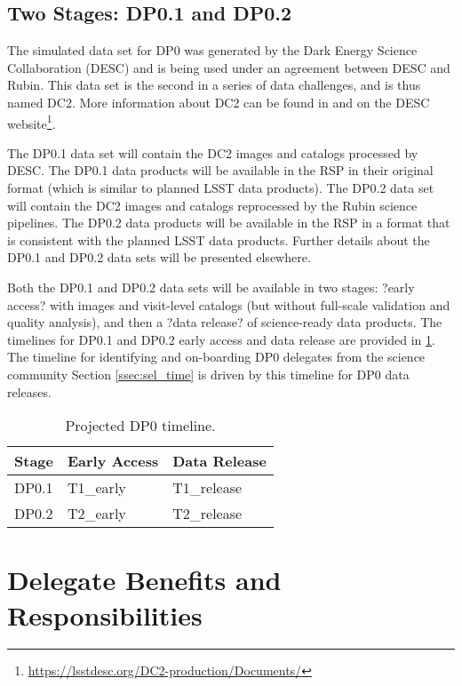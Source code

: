 \documentclass[DM,authoryear,toc]{lsstdoc}
\begin{document}
\subsection{Two Stages: DP0.1 and DP0.2}\label{ssec:intro_stages}

The simulated data set for DP0 was generated by the Dark Energy Science Collaboration (DESC) and is being used under an agreement between DESC and Rubin.
This data set is the second in a series of data challenges, and is thus named DC2.
More information about DC2 can be found in \citet{2020arXiv201005926L} and on the DESC website\footnote{\url{https://lsstdesc.org/DC2-production/Documents/}}.

The DP0.1 data set will contain the DC2 images and catalogs processed by DESC.
The DP0.1 data products will be available in the RSP in their original format (which is similar to planned LSST data products).
The DP0.2 data set will contain the DC2 images and catalogs reprocessed by the Rubin science pipelines.
The DP0.2 data products will be available in the RSP in a format that is consistent with the planned LSST data products.
Further details about the DP0.1 and DP0.2 data sets will be presented elsewhere.

Both the DP0.1 and DP0.2 data sets will be available in two stages: ?early access? with images and visit-level catalogs (but without full-scale validation and quality analysis), and then a ?data release? of science-ready data products. 
The timelines for DP0.1 and DP0.2 early access and data release are provided in \ref{tab:dp0_timeline}. The timeline for identifying and on-boarding DP0 delegates from the science community Section \ref{ssec:sel_time} is driven by this timeline for DP0 data releases.

\begin{table}
\centering
\caption{Projected DP0 timeline.}\label{tab:dp0_timeline}
\begin{tabular}{lll}
\hline
Stage & Early Access & Data Release \\
\hline \hline
DP0.1 & T1_{early} & T1_{release} \\
DP0.2 & T2_{early} & T2_{release} \\
\hline
\end{tabular}
\end{table}


\section{Delegate Benefits and Responsibilities}\label{sec:del}
\end{document}

